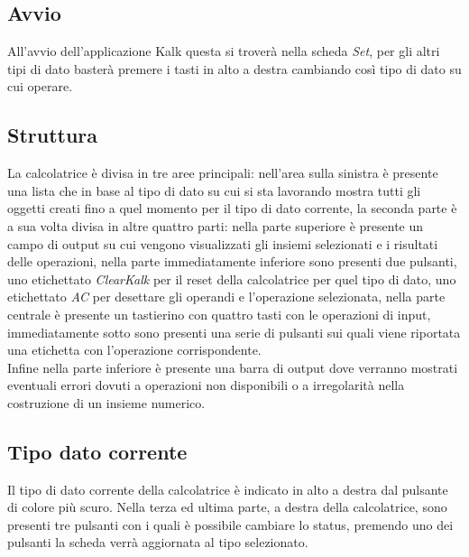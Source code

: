 \documentclass[a4paper,10pt]{article}
\begin{document}
            \subsection{Avvio}
            All’avvio dell’applicazione Kalk questa si troverà nella scheda \textit{Set}, per gli altri tipi di dato basterà premere i tasti in alto a destra cambiando così tipo di dato su cui operare.
            \subsection{Struttura}
            La calcolatrice è divisa in tre aree principali: nell’area sulla sinistra è presente una lista che in base al tipo di dato su cui si sta lavorando mostra tutti gli oggetti creati fino a quel momento per il tipo di dato corrente, la seconda parte è a sua volta divisa in altre quattro parti: nella parte superiore è presente un campo di output su cui vengono visualizzati gli insiemi selezionati e i risultati delle operazioni, nella parte immediatamente inferiore sono presenti due pulsanti, uno etichettato \textit{ClearKalk} per il reset della calcolatrice per quel tipo di dato, uno etichettato \textit{AC} per desettare gli operandi e l'operazione selezionata, nella parte centrale è presente un tastierino con quattro tasti con le operazioni di input, immediatamente sotto sono presenti una serie di pulsanti sui quali viene riportata una etichetta con l’operazione corrispondente.\\
            Infine nella parte inferiore è presente una barra di output dove verranno mostrati eventuali errori dovuti a operazioni non disponibili o a irregolarità nella costruzione di un insieme numerico.
            \subsection{Tipo dato corrente}
            Il tipo di dato corrente della calcolatrice è indicato in alto a destra dal pulsante di colore più scuro.
            Nella terza ed ultima parte, a destra della calcolatrice, sono presenti tre pulsanti con i quali è possibile cambiare lo status, premendo uno dei pulsanti la scheda verrà aggiornata al tipo selezionato. 
\end{document}
